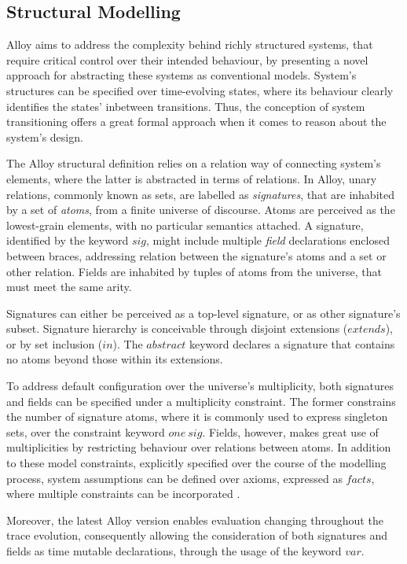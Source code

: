 \subsection{Structural Modelling}\label{c:alloy-sm}

Alloy aims to address the complexity behind richly structured systems, that require critical control over their intended behaviour, by presenting a novel approach for abstracting these systems as conventional models. System's structures can be specified over time-evolving states, where its behaviour clearly identifies the states' inbetween transitions. Thus, the conception of system transitioning offers a great formal approach when it comes to reason about the system's design.

The Alloy structural definition relies on a relation way of connecting system's elements, where the latter is abstracted in terms of relations. In Alloy, unary relations, commonly known as sets, are labelled as \textit{signatures}, that are inhabited by a set of \textit{atoms}, from a finite universe of discourse. Atoms are perceived as the lowest-grain elements, with no particular semantics attached. A signature, identified by the keyword $sig$, might include multiple \textit{field} declarations enclosed between braces, addressing relation between the signature's atoms and a set or other relation. Fields are inhabited by tuples of atoms from the universe, that must meet the same arity.

Signatures can either be perceived as a top-level signature, or as other signature's subset. Signature hierarchy is conceivable through disjoint extensions ($extends$), or by set inclusion ($in$). The $abstract$ keyword declares a signature that contains no atoms beyond those within its extensions. 

To address default configuration over the universe's multiplicity, both signatures and fields can be specified under a multiplicity constraint. The former constrains the number of signature atoms, where it is commonly used to express singleton sets, over the constraint keyword $one\ sig$. Fields, however, makes great use of multiplicities by restricting behaviour over relations between atoms. In addition to these model constraints, explicitly specified over the course of the modelling process, system assumptions can be defined over axioms, expressed as $facts$, where multiple constraints can be incorporated \cite{gheyi2007formally}.

Moreover, the latest Alloy version enables evaluation changing throughout the trace evolution, consequently allowing the consideration of both signatures and fields as time mutable declarations, through the usage of the keyword $var$.

